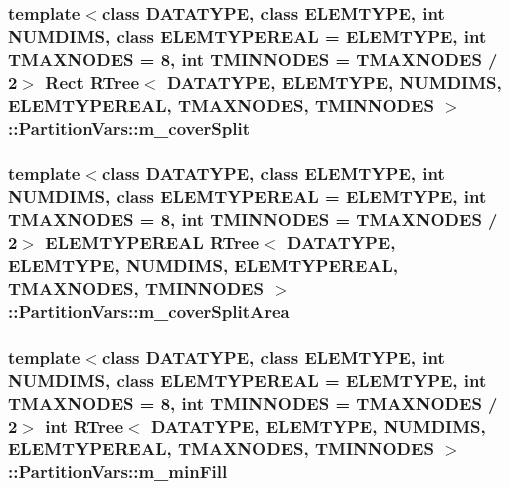 \hypertarget{structRTree_1_1PartitionVars_a61d9eaaae4128365146d923123f4b8d1}{
\subsubsection[{m\-\_\-cover\-Split}]{\setlength{\rightskip}{0pt plus 5cm}template$<$class D\-A\-T\-A\-T\-Y\-P\-E, class E\-L\-E\-M\-T\-Y\-P\-E, int N\-U\-M\-D\-I\-M\-S, class E\-L\-E\-M\-T\-Y\-P\-E\-R\-E\-A\-L = E\-L\-E\-M\-T\-Y\-P\-E, int T\-M\-A\-X\-N\-O\-D\-E\-S = 8, int T\-M\-I\-N\-N\-O\-D\-E\-S = T\-M\-A\-X\-N\-O\-D\-E\-S / 2$>$ {\bf Rect} {\bf R\-Tree}$<$ D\-A\-T\-A\-T\-Y\-P\-E, E\-L\-E\-M\-T\-Y\-P\-E, N\-U\-M\-D\-I\-M\-S, E\-L\-E\-M\-T\-Y\-P\-E\-R\-E\-A\-L, T\-M\-A\-X\-N\-O\-D\-E\-S, T\-M\-I\-N\-N\-O\-D\-E\-S $>$\-::Partition\-Vars\-::m\-\_\-cover\-Split}}\label{structRTree_1_1PartitionVars_a61d9eaaae4128365146d923123f4b8d1}
\hypertarget{structRTree_1_1PartitionVars_ada65c4c4ae559f43f3b632bda1b7b7f2}{
\subsubsection[{m\-\_\-cover\-Split\-Area}]{\setlength{\rightskip}{0pt plus 5cm}template$<$class D\-A\-T\-A\-T\-Y\-P\-E, class E\-L\-E\-M\-T\-Y\-P\-E, int N\-U\-M\-D\-I\-M\-S, class E\-L\-E\-M\-T\-Y\-P\-E\-R\-E\-A\-L = E\-L\-E\-M\-T\-Y\-P\-E, int T\-M\-A\-X\-N\-O\-D\-E\-S = 8, int T\-M\-I\-N\-N\-O\-D\-E\-S = T\-M\-A\-X\-N\-O\-D\-E\-S / 2$>$ E\-L\-E\-M\-T\-Y\-P\-E\-R\-E\-A\-L {\bf R\-Tree}$<$ D\-A\-T\-A\-T\-Y\-P\-E, E\-L\-E\-M\-T\-Y\-P\-E, N\-U\-M\-D\-I\-M\-S, E\-L\-E\-M\-T\-Y\-P\-E\-R\-E\-A\-L, T\-M\-A\-X\-N\-O\-D\-E\-S, T\-M\-I\-N\-N\-O\-D\-E\-S $>$\-::Partition\-Vars\-::m\-\_\-cover\-Split\-Area}}\label{structRTree_1_1PartitionVars_ada65c4c4ae559f43f3b632bda1b7b7f2}
\hypertarget{structRTree_1_1PartitionVars_a150d1fb0e446df4172c68eafbd0fc00d}{
\subsubsection[{m\-\_\-min\-Fill}]{\setlength{\rightskip}{0pt plus 5cm}template$<$class D\-A\-T\-A\-T\-Y\-P\-E, class E\-L\-E\-M\-T\-Y\-P\-E, int N\-U\-M\-D\-I\-M\-S, class E\-L\-E\-M\-T\-Y\-P\-E\-R\-E\-A\-L = E\-L\-E\-M\-T\-Y\-P\-E, int T\-M\-A\-X\-N\-O\-D\-E\-S = 8, int T\-M\-I\-N\-N\-O\-D\-E\-S = T\-M\-A\-X\-N\-O\-D\-E\-S / 2$>$ int {\bf R\-Tree}$<$ D\-A\-T\-A\-T\-Y\-P\-E, E\-L\-E\-M\-T\-Y\-P\-E, N\-U\-M\-D\-I\-M\-S, E\-L\-E\-M\-T\-Y\-P\-E\-R\-E\-A\-L, T\-M\-A\-X\-N\-O\-D\-E\-S, T\-M\-I\-N\-N\-O\-D\-E\-S $>$\-::Partition\-Vars\-::m\-\_\-min\-Fill}}\label{structRTree_1_1PartitionVars_a150d1fb0e446df4172c68eafbd0fc00d}
